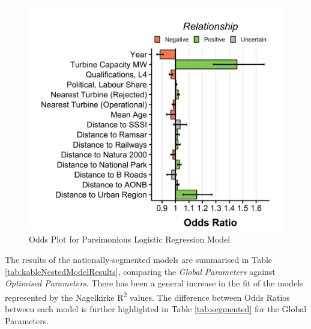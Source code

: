 \documentclass[a4paper,]{article}
\theoremstyle{definition}
\theoremstyle{definition}
\theoremstyle{definition}
\theoremstyle{remark}
\begin{document}
\begin{figure}[h]

{\centering \includegraphics[width=0.5\linewidth]{figures/figure7} 

}

\caption{Odds Plot for Parsimonious Logistic Regression Model}\label{fig:oddsPars}
\end{figure}

The results of the nationally-segmented models are summarised in Table \ref{tab:kableNestedModelResults}, comparing the \emph{Global Parameters} against \emph{Optimised Parameters}. There has been a general increase in the fit of the models represented by the Nagelkirke R\textsuperscript{2} values. The difference between Odds Ratios between each model is further highlighted in Table \ref{tab:segmented} for the Global Parameters.

\begin{table}[!h]

\caption{\label{tab:kableNestedModelResults}Comparison of subset Logistic Regression Models based on the global parameters list}
\centering
{}
\end{table}
\end{document}
